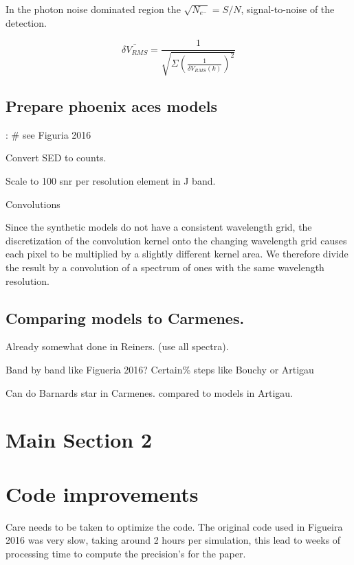 In the photon noise dominated region the \(\sqrt{N_{e^-}} = S/N\), signal-to-noise of the detection.  


\begin{equation}
\bar{\delta V_{RMS}} = \frac{1}{\sqrt{\Sigma{(\frac{1}{\delta V_{RMS}(k)})^2}}}
\end{equation}



\subsection{Prepare phoenix aces models}:
\# see Figuria 2016

Convert SED to counts.


Scale to 100 snr per resolution element in J band.

Convolutions


Since the synthetic models do not have a consistent wavelength grid, the discretization of the convolution kernel onto the  changing wavelength grid causes each pixel to be multiplied by  a slightly different kernel area. We therefore divide the result by a convolution of a spectrum of ones with the same wavelength resolution.



\subsection{Comparing models to Carmenes.}
Already somewhat done in Reiners. (use all spectra).

Band by band like Figueria 2016?
Certain\% steps like Bouchy or Artigau


Can do Barnards star in Carmenes. compared to models in Artigau.




\section{Main Section 2}



\section{Code improvements}
Care needs to be taken to optimize the code. The original code used in Figueira 2016 was very slow, taking around 2 hours per simulation, this lead to weeks of processing time to compute the precision's for the paper.

